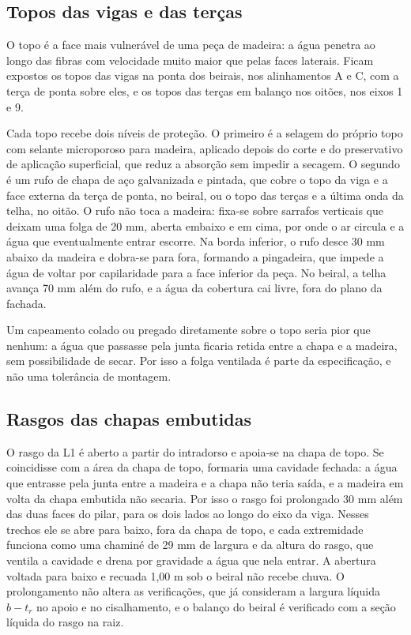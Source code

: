 \subsection{Topos das vigas e das terças}\label{ssec:topos-expostos}

O topo é a face mais vulnerável de uma peça de madeira: a água penetra ao longo
das fibras com velocidade muito maior que pelas faces laterais. Ficam expostos os
topos das vigas na ponta dos beirais, nos alinhamentos A e C, com a terça de ponta
sobre eles, e os topos das terças em balanço nos oitões, nos eixos 1 e 9.

Cada topo recebe dois níveis de proteção. O primeiro é a selagem do próprio topo
com selante microporoso para madeira, aplicado depois do corte e do preservativo
de aplicação superficial, que reduz a absorção sem impedir a secagem. O segundo é
um rufo de chapa de aço galvanizada e pintada, que cobre o topo da viga e a face
externa da terça de ponta, no beiral, ou o topo das terças e a última onda da
telha, no oitão. O rufo não toca a madeira: fixa-se sobre sarrafos verticais que
deixam uma folga de 20 mm, aberta embaixo e em cima, por onde o ar circula e a
água que eventualmente entrar escorre. Na borda inferior, o rufo desce 30 mm abaixo
da madeira e dobra-se para fora, formando a pingadeira, que impede a água de
voltar por capilaridade para a face inferior da peça. No beiral, a telha avança
70 mm além do rufo, e a água da cobertura cai livre, fora do plano da fachada.

Um capeamento colado ou pregado diretamente sobre o topo seria pior que nenhum: a
água que passasse pela junta ficaria retida entre a chapa e a madeira, sem
possibilidade de secar. Por isso a folga ventilada é parte da especificação, e não
uma tolerância de montagem.

\subsection{Rasgos das chapas embutidas}\label{ssec:vedacao-rasgo}

O rasgo da L1 é aberto a partir do intradorso e apoia-se na chapa de topo. Se
coincidisse com a área da chapa de topo, formaria uma cavidade fechada: a água
que entrasse pela junta entre a madeira e a chapa não teria saída, e a madeira em
volta da chapa embutida não secaria. Por isso o rasgo foi prolongado 30 mm além
das duas faces do pilar, para os dois lados ao longo do eixo da viga. Nesses
trechos ele se abre para baixo, fora da chapa de topo, e cada extremidade funciona
como uma chaminé de 29 mm de largura e da altura do rasgo, que ventila a cavidade
e drena por gravidade a água que nela entrar. A abertura voltada para baixo e
recuada 1,00 m sob o beiral não recebe chuva. O prolongamento não altera as
verificações, que já consideram a largura líquida $b - t_r$ no apoio e no
cisalhamento, e o balanço do beiral é verificado com a seção líquida do rasgo na
raiz.

